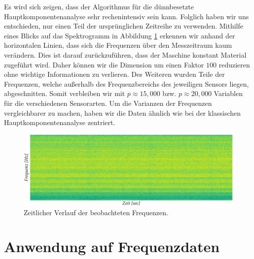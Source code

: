 Es wird sich zeigen, dass der Algorithmus für die dünnbesetzte Hauptkomponentenanalyse sehr rechenintensiv sein kann. Folglich haben wir uns entschieden, nur einen Teil der ursprünglichen Zeitreihe zu verwenden. Mithilfe eines Blicks auf das Spektrogramm in Abbildung \ref{spectrogram} erkennen wir anhand der horizontalen Linien, dass sich die Frequenzen über den Messzeitraum kaum verändern. Dies ist darauf zurückzuführen, dass der Maschine konstant Material zugeführt wird. Daher können wir die Dimension um einen Faktor $100$ reduzieren ohne wichtige Informationen zu verlieren. Des Weiteren wurden Teile der Frequenzen, welche außerhalb des Frequenzbereichs des jeweiligen Sensors liegen, abgeschnitten. Somit verbleiben wir mit $p \approx 15,000$ bzw. $p \approx 20,000$ Variablen für die verschiedenen Sensorarten. Um die Varianzen der Frequenzen vergleichbarer zu machen, haben wir die Daten ähnlich wie bei der klassischen Hauptkomponentenanalyse zentriert.

\begin{figure}
\centering
\includegraphics[width=\textwidth]{figures/Signal_5_time_frequency_change.jpg}
\caption{Zeitlicher Verlauf der beobachteten Frequenzen.}
\label{spectrogram}
\end{figure}



\section{Anwendung auf Frequenzdaten}
\label{application_frequency_data}

